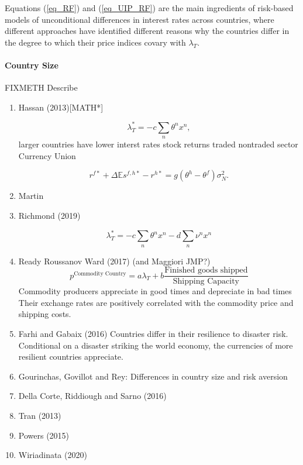\documentclass{ar-1col}
\begin{document}
Equations (\ref{eq_RF}) and (\ref{eq_UIP_RF}) are the main ingredients
of risk-based models of unconditional differences in interest rates
across countries, where different approaches have identified different reasons why the countries differ in the degree to which their price indices covary with $\lambda_T$.

\paragraph*{Country Size}




FIXMETH Describe
\begin{enumerate}
\item Hassan (2013)[MATH*]

\begin{equation} \lambda_{T}^\ast = -c
  \sum_{n} \theta^n x^n,
  \label{eqn:lambdat2NP}
\end{equation}
larger countries have lower interst rates
stock returns traded nontraded sector
Currency Union

\begin{equation}
  r^{f \ast} + \Delta \mathbb{E} s^{f, h \ast} - r^{h \ast}
  =g\left(\theta^h - \theta^f\right) \sigma_N^2.
  \label{eq_FF_UIP}
\end{equation}
\item Martin
\item Richmond (2019)

$$\lambda_{T}^\ast = -c
  \sum_{n} \theta^n x^n- d\sum_{n} \nu^n x^n$$



\item Ready Roussanov Ward (2017) (and Maggiori JMP?)
$$p^{\text{Commodity Country}}=a\lambda_T+b\frac{\text{Finished goods shipped}}{\text{Shipping Capacity}} $$
Commodity producers appreciate in good times and depreciate in bad times
Their exchange rates are positively correlated with the commodity price and shipping costs.
\item Farhi and Gabaix (2016)
Countries differ in their resilience to disaster risk. Conditional on a disaster striking the world economy, the currencies of more resilient countries appreciate. 
\item Gourinchas, Govillot and Rey: Differences in country size and risk aversion
\item Della Corte, Riddiough and Sarno (2016)
\item Tran (2013)
\item Powers (2015)
\item Wiriadinata (2020)
\end{enumerate}
\end{document}
